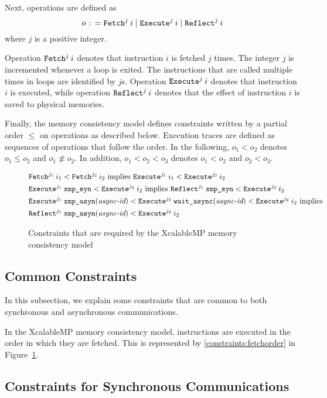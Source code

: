 Next, operations are defined as
\[
o \mathrel{\colon\!=} \texttt{Fetch}^{j} \: {i} \mid \texttt{Execute}^{j} \: {i} \mid \texttt{Reflect}^{j} \: {i}
\]
where $j$ is a positive integer.

Operation $\texttt{Fetch}^{j} \: {i}$ denotes that instruction $i$ is fetched $j$
times.  The integer $j$ is incremented whenever a loop is exited.  The
instructions that are called multiple times in loops are identified by
$j$s.  Operation $\texttt{Execute}^{j} \: {i}$ denotes that instruction $i$ is executed,
while operation $\texttt{Reflect}^{j} \: {i}$ denotes that the effect of instruction $i$
is saved to physical memories.

Finally, the memory consistency model defines constraints written by a
partial order $\leq$ on operations as described below.  Execution
traces are defined as sequences of operations that follow the order.
In the following, $o_1 < o_2$ denotes $o_1 \leq o_2$ and $o_1
\not\equiv o_2$.  In addition, $o_1 < o_2 < o_3$ denotes $o_1 < o_2$
and $o_2 < o_3$.

{
\renewcommand{\theequation}{\roman{equation}}
\begin{figure}[htbp]
\begin{align}
& \texttt{Fetch}^{j_1} \: {i_1} < \texttt{Fetch}^{j_2} \: {i_2} \mbox{ implies } \texttt{Execute}^{j_1} \: {i_1} < \texttt{Execute}^{j_2} \: {i_2} \label{constraints:fetchorder}\\
& \texttt{Execute}^{j_1} \: {\texttt{xmp\_syn}} < \texttt{Execute}^{j_2} \: {i_2} \mbox{ implies } \texttt{Reflect}^{j_1} \: {\texttt{xmp\_syn}} < \texttt{Execute}^{j_2} \: {i_2} \label{constraints:synchronous}\\
& \texttt{Execute}^{j_1} \: {\texttt{xmp\_asyn}(\textit{async-id})} < \texttt{Execute}^{j_3} \: {\texttt{wait\_async}(\textit{async-id})} < \texttt{Execute}^{j_2} \: {i_2} \mbox{ implies} \nonumber\\
& \texttt{Reflect}^{j_1} \: {\texttt{xmp\_asyn}(\textit{async-id})} < \texttt{Execute}^{j_2} \: {i_2} \label{constraints:asynchronous}
\end{align}
\caption{Constraints that are required by the XcalableMP memory consistency model}\label{fig:constraints}
\end{figure}
}

\subsection{Common Constraints}

In this subsection, we explain some constraints that are common to both
synchronous and asynchronous communications.

In the XcalableMP memory consistency model, instructions are executed in
the order in which they are fetched.  This is represented by
\ref{constraints:fetchorder} in Figure~\ref{fig:constraints}.

\subsection{Constraints for Synchronous Communications}

